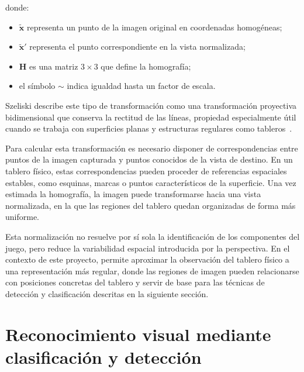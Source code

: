 donde:

\begin{itemize}
    \item \(\tilde{\mathbf{x}}\) representa un punto de la imagen original en coordenadas homogéneas;
    \item \(\tilde{\mathbf{x}}'\) representa el punto correspondiente en la vista normalizada;
    \item \(\mathbf{H}\) es una matriz \(3 \times 3\) que define la homografía;
    \item el símbolo \(\sim\) indica igualdad hasta un factor de escala.
\end{itemize}

Szeliski describe este tipo de transformación como una transformación proyectiva bidimensional que conserva la rectitud de las líneas, propiedad especialmente útil cuando se trabaja con superficies planas y estructuras regulares como tableros~\cite{szeliski2022computerVision}.

Para calcular esta transformación es necesario disponer de correspondencias entre puntos de la imagen capturada y puntos conocidos de la vista de destino. En un tablero físico, estas correspondencias pueden proceder de referencias espaciales estables, como esquinas, marcas o puntos característicos de la superficie. Una vez estimada la homografía, la imagen puede transformarse hacia una vista normalizada, en la que las regiones del tablero quedan organizadas de forma más uniforme.

Esta normalización no resuelve por sí sola la identificación de los componentes del juego, pero reduce la variabilidad espacial introducida por la perspectiva. En el contexto de este proyecto, permite aproximar la observación del tablero físico a una representación más regular, donde las regiones de imagen pueden relacionarse con posiciones concretas del tablero y servir de base para las técnicas de detección y clasificación descritas en la siguiente sección.


\section{Reconocimiento visual mediante clasificación y detección}
\label{sec:reconocimiento-visual-clasificacion-deteccion}


